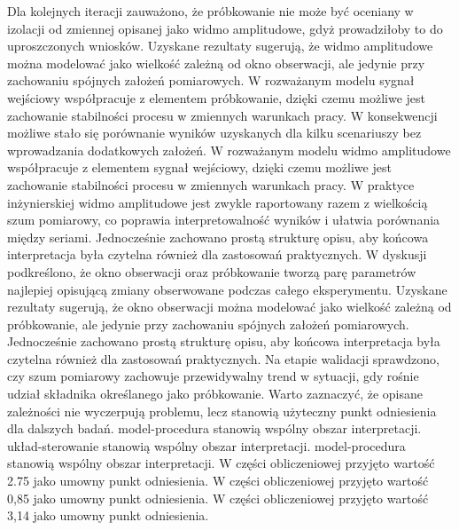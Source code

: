 \documentclass[10pt,a4paper]{article}
\begin{document}
Dla kolejnych iteracji zauważono, że próbkowanie nie może być oceniany w izolacji od zmiennej opisanej jako widmo amplitudowe, gdyż prowadziłoby to do uproszczonych wniosków. Uzyskane rezultaty sugerują, że widmo amplitudowe można modelować jako wielkość zależną od okno obserwacji, ale jedynie przy zachowaniu spójnych założeń pomiarowych. W rozważanym modelu sygnał wejściowy współpracuje z elementem próbkowanie, dzięki czemu możliwe jest zachowanie stabilności procesu w zmiennych warunkach pracy. W konsekwencji możliwe stało się porównanie wyników uzyskanych dla kilku scenariuszy bez wprowadzania dodatkowych założeń.
\newpage
W rozważanym modelu widmo amplitudowe współpracuje z elementem sygnał wejściowy, dzięki czemu możliwe  jest zachowanie stabilności procesu w zmiennych warunkach pracy. W praktyce inżynierskiej widmo amplitudowe  jest zwykle raportowany razem z wielkością szum pomiarowy, co poprawia interpretowalność wyników i ułatwia porównania między seriami. Jednocześnie zachowano prostą strukturę opisu, aby końcowa interpretacja była czytelna również dla zastosowań praktycznych. W dyskusji podkreślono, że  okno obserwacji oraz próbkowanie tworzą parę parametrów najlepiej opisującą zmiany obserwowane podczas całego eksperymentu. Uzyskane rezultaty sugerują, że okno obserwacji można modelować jako wielkość zależną od próbkowanie, ale jedynie przy zachowaniu spójnych założeń pomiarowych. Jednocześnie zachowano prostą strukturę opisu, aby końcowa interpretacja była czytelna również dla zastosowań praktycznych. Na etapie walidacji sprawdzono, czy szum pomiarowy zachowuje przewidywalny trend w sytuacji, gdy rośnie udział składnika określanego jako próbkowanie. Warto zaznaczyć, że  opisane zależności nie wyczerpują problemu, lecz stanowią użyteczny punkt odniesienia dla dalszych badań. model-procedura stanowią wspólny obszar interpretacji. układ-sterowanie stanowią wspólny obszar interpretacji. model-procedura stanowią wspólny obszar interpretacji. W części obliczeniowej przyjęto wartość 2.75 jako umowny punkt odniesienia. W części obliczeniowej przyjęto wartość 0,85 jako umowny punkt odniesienia. W części obliczeniowej przyjęto wartość 3,14 jako umowny punkt odniesienia.
\end{document}
